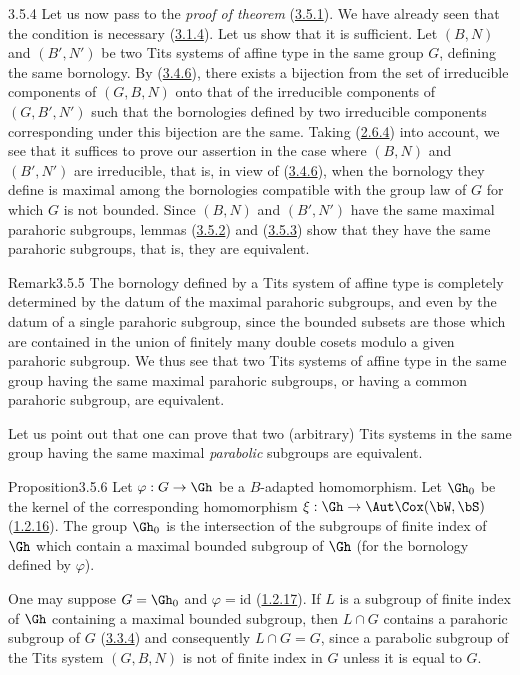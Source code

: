 \documentclass[12pt,a4paper,oneside,english]{smfart}
\makeatletter
\newcommand{\btanchor}[1]{\leavevmode\Hy@raisedlink{\hypertarget{bt:#1}{}}}
\newcommand{\btref}[1]{\hyperlink{bt:#1}{#1}}
\theoremstyle{definition}
\theoremstyle{bt}
\makeatother
\begin{document}
\num{3.5.4}\btanchor{3.5.4}
Let us now pass to the \emph{proof of theorem} (\btref{3.5.1}). We have already seen
that the condition is necessary (\btref{3.1.4}). Let us show that it is sufficient.
Let $(B,N)$ and $(B',N')$ be two Tits systems of affine type in the same
group $G$, defining the same bornology. By (\btref{3.4.6}), there exists a bijection
from the set of irreducible components of $(G,B,N)$ onto that of the
irreducible components of $(G,B',N')$ such that the bornologies defined by
two irreducible components corresponding under this bijection are the same.
Taking (\btref{2.6.4}) into account, we see that it suffices to prove our assertion
in the case where $(B,N)$ and $(B',N')$ are irreducible, that is, in view of
(\btref{3.4.6}), when the bornology they define is maximal among the bornologies
compatible with the group law of $G$ for which $G$ is not bounded. Since
$(B,N)$ and $(B',N')$ have the same maximal parahoric subgroups, lemmas
(\btref{3.5.2}) and (\btref{3.5.3}) show that they have the same parahoric subgroups, that
is, they are equivalent.

\begin{state}{Remark}{3.5.5}\btanchor{3.5.5}
\upshape
The bornology defined by a Tits system of affine type is completely
determined by the datum of the maximal parahoric subgroups, and even by the
datum of a single parahoric subgroup, since the bounded subsets are those
which are contained in the union of finitely many double cosets modulo a
given parahoric subgroup. We thus see that two Tits systems of affine type in
the same group having the same maximal parahoric subgroups, or having a
common parahoric subgroup, are equivalent.

Let us point out that one can prove that two (arbitrary) Tits systems in the
same group having the same maximal \emph{parabolic} subgroups are equivalent.
\end{state}

\begin{state}{Proposition}{3.5.6}\btanchor{3.5.6}
Let $\varphi : G\to\Gh$ be a $B$-adapted homomorphism. Let $\Gh_0$ be the
kernel of the corresponding homomorphism $\xi : \Gh \to \Aut\Cox(\bW,\bS)$
(\btref{1.2.16}). The group $\Gh_0$ is the intersection of the subgroups of finite
index of $\Gh$ which contain a maximal bounded subgroup of $\Gh$ (for the
bornology defined by $\varphi$).
\end{state}

One may suppose $G = \Gh_0$ and $\varphi = \mathrm{id}$ (\btref{1.2.17}). If $L$ is a
subgroup of finite index of $\Gh$ containing a maximal bounded subgroup, then
$L\cap G$ contains a parahoric subgroup of $G$ (\btref{3.3.4}) and consequently
$L\cap G = G$, since a parabolic subgroup of the Tits system $(G,B,N)$ is not
of finite index in $G$ unless it is equal to $G$.
\end{document}
